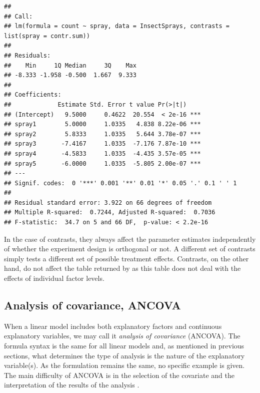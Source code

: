 \documentclass[krantz2]{krantz}\usepackage{knitr}
\begin{document}
\begin{warningbox}
\begin{knitrout}\footnotesize
{}\color{fgcolor}\begin{kframe}
\begin{alltt}
\end{alltt}
\begin{verbatim}
## 
## Call:
## lm(formula = count ~ spray, data = InsectSprays, contrasts = list(spray = contr.sum))
## 
## Residuals:
##    Min     1Q Median     3Q    Max 
## -8.333 -1.958 -0.500  1.667  9.333 
## 
## Coefficients:
##             Estimate Std. Error t value Pr(>|t|)    
## (Intercept)   9.5000     0.4622  20.554  < 2e-16 ***
## spray1        5.0000     1.0335   4.838 8.22e-06 ***
## spray2        5.8333     1.0335   5.644 3.78e-07 ***
## spray3       -7.4167     1.0335  -7.176 7.87e-10 ***
## spray4       -4.5833     1.0335  -4.435 3.57e-05 ***
## spray5       -6.0000     1.0335  -5.805 2.00e-07 ***
## ---
## Signif. codes:  0 '***' 0.001 '**' 0.01 '*' 0.05 '.' 0.1 ' ' 1
## 
## Residual standard error: 3.922 on 66 degrees of freedom
## Multiple R-squared:  0.7244,	Adjusted R-squared:  0.7036 
## F-statistic:  34.7 on 5 and 66 DF,  p-value: < 2.2e-16
\end{verbatim}
\end{kframe}
\end{knitrout}

In the case of contrasts, they always affect the parameter estimates independently of whether the experiment design is orthogonal or not. A different set of contrasts simply tests a different set of possible treatment effects. Contrasts, on the other hand, do not affect the table returned by  as this table does not deal with the effects of individual factor levels.
\end{warningbox}

\subsection{Analysis of covariance, ANCOVA}

When a linear model includes both explanatory factors and continuous explanatory variables, we may call it \emph{analysis of covariance} (ANCOVA). The formula syntax is the same for all linear models and, as mentioned in previous sections, what determines the type of analysis is the nature of the explanatory variable(s). As the formulation remains the same, no specific example is given. The main difficulty of ANCOVA is in the selection of the covariate and the interpretation of the results of the analysis \autocite[e.g.][]{Smith1957}.
\end{document}
